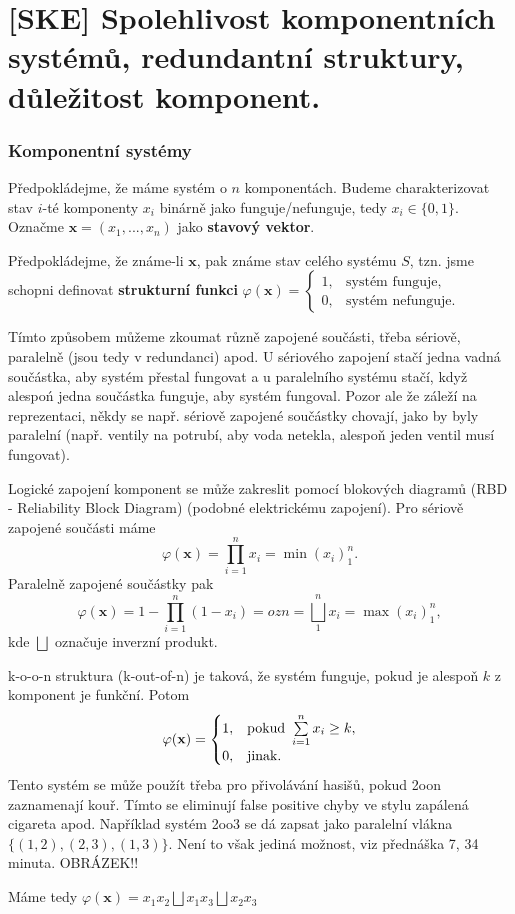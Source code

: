 \chapter{[SKE] Spolehlivost komponentních systémů, redundantní struktury, důležitost komponent.}

\subsection{Komponentní systémy}
\begin{define}
	Předpokládejme, že máme systém o $n$ komponentách. Budeme charakterizovat stav $i$-té komponenty $x_i$ binárně jako funguje/nefunguje, tedy $x_i\in\{0,1\}$. Označme $\textbf{x}=(x_1,...,x_n)$ jako \textbf{stavový vektor}. 
	
	Předpokládejme, že známe-li $\textbf{x}$, pak známe stav celého systému $S$, tzn. jsme schopni definovat \textbf{strukturní funkci} $\varphi(\textbf{x})=\begin{cases}
	1,&\text{systém funguje,}\\0,&\text{systém nefunguje.}
	\end{cases}$
\end{define}

Tímto způsobem můžeme zkoumat různě zapojené součásti, třeba sériově, paralelně (jsou tedy v redundanci) apod. U sériového zapojení stačí jedna vadná součástka, aby systém přestal fungovat a u paralelního systému stačí, když alespoń jedna součástka funguje, aby systém fungoval. Pozor ale že záleží na reprezentaci, někdy se např. sériově zapojené součástky chovají, jako by byly paralelní (např. ventily na potrubí, aby voda netekla, alespoň jeden ventil musí fungovat).

\begin{corollary}
	Logické zapojení komponent se může zakreslit pomocí blokových diagramů (RBD - Reliability Block Diagram) (podobné elektrickému zapojení). Pro sériově zapojené součásti máme 
$$ \varphi(\textbf{x})=\prod_{i=1}^{n}x_i=\min(x_i)_1^n.$$
Paralelně zapojené součástky pak
$$ \varphi(\textbf{x})=1-\prod_{i=1}^{n}(1-x_i)\equal{ozn}=\bigsqcup_1^n x_i=\max(x_i)_1^n, $$ kde $\bigsqcup$ označuje inverzní produkt.
\end{corollary}

\begin{corollary}
	k-o-o-n struktura (k-out-of-n) je taková, že systém funguje, pokud je alespoň $k$ z komponent je funkční. Potom
	$$ \varphi(\textbf{x})=\begin{cases}
	1,&\text{pokud }\sum\limits_{i=1}^{n} x_i\geq k,\\0,& \text{jinak.}
	\end{cases}$$
	Tento systém se může použít třeba pro přivolávání hasišů, pokud 2oon zaznamenají kouř. Tímto se eliminují false positive chyby ve stylu zapálená cigareta apod. Například systém 2oo3 se dá zapsat jako paralelní vlákna $\{(1,2), (2,3),(1,3)\}$. Není to však jediná možnost, viz přednáška 7, 34 minuta. OBRÁZEK!!
	
	Máme tedy $\varphi(\textbf{x})=x_1x_2\bigsqcup x_1x_3\bigsqcup x_2x_3$
\end{corollary}


